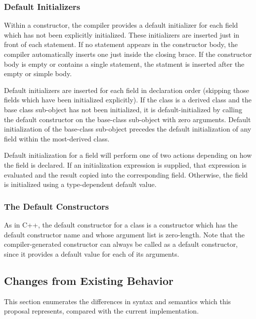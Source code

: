 \subsubsection{Default Initializers}
\label{Default_Initializers}

Within a constructor, the compiler provides a default initializer for each field
which has not been explicitly initialized.  These initializers are inserted just
in front of each  statement.  If no  statement appears in
the constructor body, the compiler automatically inserts one just inside the
closing brace.  If the constructor body is empty or contains a single statement,
the  statment is inserted after the empty or simple body.

Default initializers are inserted for each field in declaration order (skipping
those fields which have been initialized explicitly).  If the class is a derived
class and the base class sub-object has not been initialized, it is
default-initialized by calling the default constructor on the base-class
sub-object with zero arguments.  Default initialization of the base-class
sub-object precedes the default initialization of any field within the
most-derived class.

Default initialization for a field will perform one of two actions depending on how the
field is declared.  If an initialization expression is supplied, that
expression is evaluated and the result copied into the corresponding field.
Otherwise, the field is initialized using a type-dependent default
value.

\subsubsection{The Default Constructors}
\label{Default_Constructors}

As in C++, the default constructor for a class is a constructor which has the
default constructor name and whose argument
list is zero-length.  Note that the compiler-generated constructor can always be
called as a default constructor, since it provides a default value for each of
its arguments.

\subsection{Changes from Existing Behavior}

This section enumerates the differences in syntax and semantics which this
proposal represents, compared with the current implementation.

